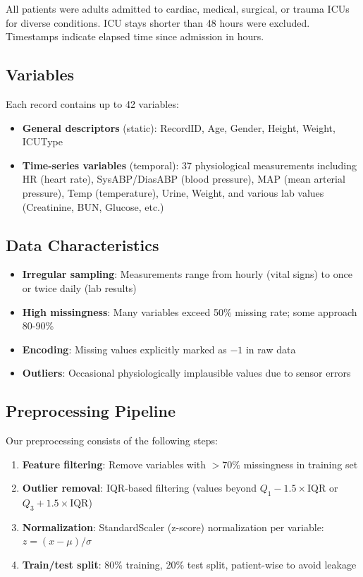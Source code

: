\documentclass[11pt]{article}
\begin{document}
All patients were adults admitted to cardiac, medical, surgical, or trauma ICUs for diverse conditions. ICU stays shorter than 48 hours were excluded. Timestamps indicate elapsed time since admission in hours.

\subsection{Variables}
Each record contains up to 42 variables:
\begin{itemize}[noitemsep]
    \item \textbf{General descriptors} (static): RecordID, Age, Gender, Height, Weight, ICUType
    \item \textbf{Time-series variables} (temporal): 37 physiological measurements including HR (heart rate), SysABP/DiasABP (blood pressure), MAP (mean arterial pressure), Temp (temperature), Urine, Weight, and various lab values (Creatinine, BUN, Glucose, etc.)
\end{itemize}

\subsection{Data Characteristics}
\begin{itemize}[noitemsep]
    \item \textbf{Irregular sampling}: Measurements range from hourly (vital signs) to once or twice daily (lab results)
    \item \textbf{High missingness}: Many variables exceed 50\% missing rate; some approach 80-90\%
    \item \textbf{Encoding}: Missing values explicitly marked as $-1$ in raw data
    \item \textbf{Outliers}: Occasional physiologically implausible values due to sensor errors
\end{itemize}

\subsection{Preprocessing Pipeline}
Our preprocessing consists of the following steps:
\begin{enumerate}[noitemsep]
    \item \textbf{Feature filtering}: Remove variables with $>70\%$ missingness in training set
    \item \textbf{Outlier removal}: IQR-based filtering (values beyond $Q_1 - 1.5 \times \text{IQR}$ or $Q_3 + 1.5 \times \text{IQR}$)
    \item \textbf{Normalization}: StandardScaler (z-score) normalization per variable: $z = (x - \mu) / \sigma$
    \item \textbf{Train/test split}: 80\% training, 20\% test split, patient-wise to avoid leakage
\end{enumerate}
\end{document}

